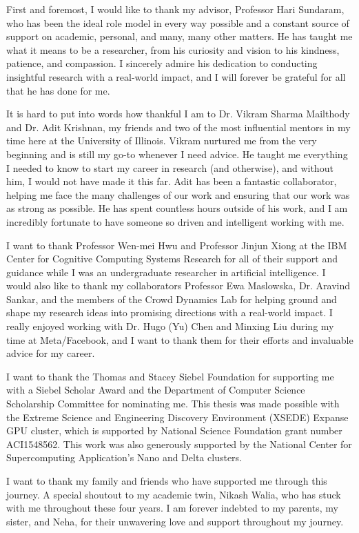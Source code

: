 First and foremost, I would like to thank my advisor, Professor Hari Sundaram, who has been the ideal role model in every way possible and a constant source of support on academic, personal, and many, many other matters. He has taught me what it means to be a researcher, from his curiosity and vision to his kindness, patience, and compassion. I sincerely admire his dedication to conducting insightful research with a real-world impact, and I will forever be grateful for all that he has done for me.

It is hard to put into words how thankful I am to Dr. Vikram Sharma Mailthody and Dr. Adit Krishnan, my friends and two of the most influential mentors in my time here at the University of Illinois. Vikram nurtured me from the very beginning and is still my go-to whenever I need advice. He taught me everything I needed to know to start my career in research (and otherwise), and without him, I would not have made it this far. Adit has been a fantastic collaborator, helping me face the many challenges of our work and ensuring that our work was as strong as possible. He has spent countless hours outside of his work, and I am incredibly fortunate to have someone so driven and intelligent working with me.

I want to thank Professor Wen-mei Hwu and Professor Jinjun Xiong at the IBM Center for Cognitive Computing Systems Research for all of their support and guidance while I was an undergraduate researcher in artificial intelligence. I would also like to thank my collaborators Professor Ewa Maslowska, Dr. Aravind Sankar, and the members of the Crowd Dynamics Lab for helping ground and shape my research ideas into promising directions with a real-world impact. I really enjoyed working with Dr. Hugo (Yu) Chen and Minxing Liu during my time at Meta/Facebook, and I want to thank them for their efforts and invaluable advice for my career.

I want to thank the Thomas and Stacey Siebel Foundation for supporting me with a Siebel Scholar Award and the Department of Computer Science Scholarship Committee for nominating me. This thesis was made possible with the Extreme Science and Engineering Discovery Environment (XSEDE) Expanse GPU cluster, which is supported by National Science Foundation grant number ACI1548562. This work was also generously supported by the National Center for Supercomputing Application’s Nano and Delta clusters.

I want to thank my family and friends who have supported me through this journey. A special shoutout to my academic twin, Nikash Walia, who has stuck with me throughout these four years. I am forever indebted to my parents, my sister, and Neha, for their unwavering love and support throughout my journey.